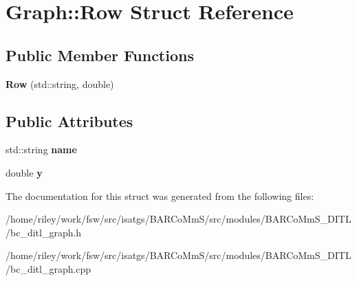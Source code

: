 \hypertarget{struct_graph_1_1_row}{}\section{Graph\+:\+:Row Struct Reference}
\label{struct_graph_1_1_row}
\subsection*{Public Member Functions}
\begin{DoxyCompactItemize}
\item 
{\bfseries Row} (std\+::string, double)\hypertarget{struct_graph_1_1_row_a0d618b3ddbd029650a43fcb7fcee1032}{}\label{struct_graph_1_1_row_a0d618b3ddbd029650a43fcb7fcee1032}

\end{DoxyCompactItemize}
\subsection*{Public Attributes}
\begin{DoxyCompactItemize}
\item 
std\+::string {\bfseries name}\hypertarget{struct_graph_1_1_row_a0ee8f29b51028867bc2eca499623e61e}{}\label{struct_graph_1_1_row_a0ee8f29b51028867bc2eca499623e61e}

\item 
double {\bfseries y}\hypertarget{struct_graph_1_1_row_a5bc3df1793b16b88a516e00abefe2014}{}\label{struct_graph_1_1_row_a5bc3df1793b16b88a516e00abefe2014}

\end{DoxyCompactItemize}


The documentation for this struct was generated from the following files\+:\begin{DoxyCompactItemize}
\item 
/home/riley/work/fsw/src/isatgs/\+B\+A\+R\+Co\+Mm\+S/src/modules/\+B\+A\+R\+Co\+Mm\+S\+\_\+\+D\+I\+T\+L/bc\+\_\+ditl\+\_\+graph.\+h\item 
/home/riley/work/fsw/src/isatgs/\+B\+A\+R\+Co\+Mm\+S/src/modules/\+B\+A\+R\+Co\+Mm\+S\+\_\+\+D\+I\+T\+L/bc\+\_\+ditl\+\_\+graph.\+cpp\end{DoxyCompactItemize}
